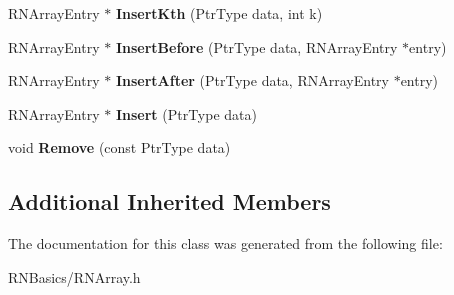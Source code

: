 \begin{DoxyCompactItemize}
\item 
R\+N\+Array\+Entry $\ast$ {\bfseries Insert\+Kth} (Ptr\+Type data, int k)\hypertarget{class_r_n_array_a2c6e6798e2df161e0cd207bfd52d4a6e}{}\label{class_r_n_array_a2c6e6798e2df161e0cd207bfd52d4a6e}

\item 
R\+N\+Array\+Entry $\ast$ {\bfseries Insert\+Before} (Ptr\+Type data, R\+N\+Array\+Entry $\ast$entry)\hypertarget{class_r_n_array_acbceb5e806e43c7d02b3a70dafcdc2ea}{}\label{class_r_n_array_acbceb5e806e43c7d02b3a70dafcdc2ea}

\item 
R\+N\+Array\+Entry $\ast$ {\bfseries Insert\+After} (Ptr\+Type data, R\+N\+Array\+Entry $\ast$entry)\hypertarget{class_r_n_array_a65b920866e15c1e38413f9f359519ed0}{}\label{class_r_n_array_a65b920866e15c1e38413f9f359519ed0}

\item 
R\+N\+Array\+Entry $\ast$ {\bfseries Insert} (Ptr\+Type data)\hypertarget{class_r_n_array_a49503e9d46b515c7b3fcee79a0f179a8}{}\label{class_r_n_array_a49503e9d46b515c7b3fcee79a0f179a8}

\item 
void {\bfseries Remove} (const Ptr\+Type data)\hypertarget{class_r_n_array_ae23647c259b7be63e6ce0d1a4e73c2af}{}\label{class_r_n_array_ae23647c259b7be63e6ce0d1a4e73c2af}

\end{DoxyCompactItemize}
\subsection*{Additional Inherited Members}


The documentation for this class was generated from the following file\+:\begin{DoxyCompactItemize}
\item 
R\+N\+Basics/R\+N\+Array.\+h\end{DoxyCompactItemize}
